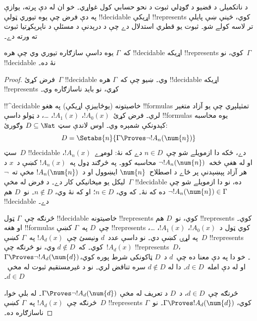 \documentclass[../../../include/open-logic-section]{subfiles}
\begin{document}


د ناتکميلۍ د قضيو د ګوډلي ثبوت د نحو حسابي کول غواړي۔ خو ان له دې
پرته، يوازې په دې فرض چې يوه تيوري ټولې !!{decidable} اړيکې
!!{represents} کوي، ځينې ښې پايلې تر لاسه کولے شو۔ ثبوت يو قطري
استدلال دے چې د درېدنې د مسئلې د ناپرېکړتيا ثبوت ته ورته دے۔

\begin{thm}
که~$\Gamma$ يوه داسې سازګاره تيوري وي چې هره !!{decidable} اړيکه
!!{represents} کوي، نو~$\Gamma$ !!{decidable} نۀ ده۔
\end{thm}

\begin{proof}
فرض کړئ~$\Gamma$ !!{decidable} وي۔ ښيو چې که~$\Gamma$ هره
!!{decidable} اړيکه !!{represents} کړي، نو بايد ناسازګاره وي۔

!!^{decidable} خاصيتونه (يوځاييزې اړيکې) په هغو !!{formula}s تمثيلېږي
چې يو آزاد متغير لري۔ فرض کړئ~$!A_0(x)$، $!A_1(x)$، \dots، د ټولو
داسې !!{formula}s يوه محاسبه کېدونکې شمېره وي۔ اوس لاندې سټ
$D \subseteq \Nat$ وګورئ:
\[
D = \Setabs{n}{\Gamma \Proves \lnot !A_n(\num{n})}
\]
سټ~$D$ !!{decidable} دے، ځکه دا ازمويلے شو چې~$n \in D$ دے که نۀ:
لومړے~$!A_n(x)$، او له هغې څخه~$\lnot !A_n(\num{n})$ محاسبه کوو۔ په
څرګند ډول په~$!A_n(x)$ کښې د~$x$ د هر آزاد پېښېدنې پر ځاے د
اصطلاح~$\num{n}$ ايښوول
او د~$!A_n(\num{n})$ مخې ته~$\lnot$ ليکل يو ميخانيکي کار دے۔ د فرض
له مخې~$\Gamma$ !!{decidable} ده، نو دا ازمويلے شو چې
$\lnot !A_n(\num{n}) \in \Gamma$ ده که نۀ۔ که وي، $n \in D$؛ او که
نۀ وي، $n \notin D$۔ نو~$D$ هم !!{decidable} دے۔

څرنګه چې~$\Gamma$ ټول !!{decidable} خاصيتونه !!{represents} کوي، نو~$D$ هم
!!{represents} کوي۔ او هغه !!{formula}s چې~$D$ په~$\Gamma$ کښې
!!{represents} کوي ټول د~$!A_0(x)$، $!A_1(x)$، \dots، په لړۍ کښې
دي۔ نو داسې عدد~$d$ ونيسئ چې~$!A_d(x)$ په~$\Gamma$ کښې~$D$
!!{represents} کوي۔ که~$d \notin D$ وي، نو څرنګه چې~$!A_d(x)$
!!{represents}~$D$، $\Gamma \Proves \lnot !A_d(\num{d})$۔ خو دا په دې معنا ده
چې~$d$ د~$D$ ټاکونکی شرط پوره کوي، او له دې امله~$d \in D$۔ دا له
$d \notin D$ سره تناقض لري۔ نو د غيرمستقيم ثبوت له مخې~$d \in D$۔

څرنګه چې~$d \in D$، د~$D$ د تعريف له مخې
$\Gamma \Proves \lnot !A_d(\num{d})$۔ له بلې خوا، څرنګه چې~$!A_d(x)$
په~$\Gamma$ کښې~$D$ !!{represents} کوي،
$\Gamma \Proves !A_d(\num{d})$۔ نو~$\Gamma$ ناسازګاره ده۔
\end{proof}
\end{document}

